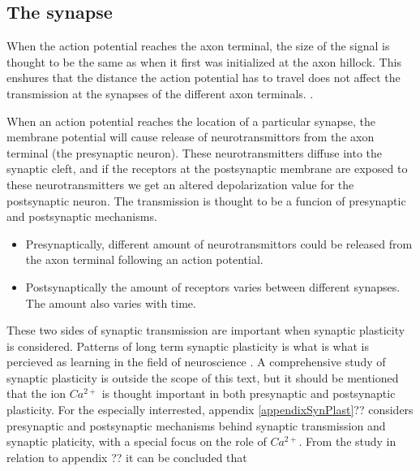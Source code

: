 \subsection{The synapse}
\label{ssecTheSynapse}
When the action potential reaches the axon terminal, the size of the signal is thought to be the same as when it first was initialized at the axon hillock.
This enshures that the distance the action potential has to travel does not affect the transmission at the synapses of the different axon terminals. \cite{NeuroscienceExploringTheBrain3edKAP4}.

When an action potential reaches the location of a particular synapse, the membrane potential will cause release of neurotransmittors from the axon terminal (the presynaptic neuron).
These neurotransmitters diffuse into the synaptic cleft, and if the receptors at the postsynaptic membrane are exposed to these neurotransmitters we get an altered depolarization value for the postsynaptic neuron.
The transmission is thought to be a funcion of presynaptic and postsynaptic mechanisms.

\begin{itemize}
	\item Presynaptically, different amount of neurotransmittors could be released from the axon terminal following an action potential.
	\item Postsynaptically the amount of receptors varies between different synapses. The amount also varies with time.%
\end{itemize}

These two sides of synaptic transmission are important when synaptic plasticity is considered. 
Patterns of long term synaptic plasticity is what is what is percieved as learning in the field of neuroscience \cite{NeuroscienceExploringTheBrain3edKAP25}.
A comprehensive study of synaptic plasticity is outside the scope of this text, but it should be mentioned that the ion $Ca^{2+}$ is thought important in both presynaptic and postsynaptic plasticity.
For the especially interrested, appendix \ref{appendixSynPlast}??%
										 	considers presynaptic and postsynaptic mechanisms behind synaptic transmission and synaptic platicity, with a special focus on the role of $Ca^{2+}$.
From the study in relation to appendix ??%
											it can be concluded that 






